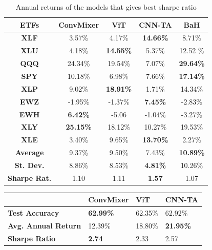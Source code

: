 \documentclass[]{article}
\begin{document}
\begin{table}[H]
\centering
 \begin{tabular}{c c c c c} 
 \hline
\textbf{ETFs} & \textbf{ConvMixer} & \textbf{ViT} & \textbf{CNN-TA} & \textbf{BaH} \\ [0.5ex] 
 \hline\hline
\textbf{XLF} & 3.57\% & 4.17\% & \textbf{14.66\%} & 8.71\% \\
 \hline
\textbf{XLU} & 4.18\% & \textbf{14.55\%} & 5.37\% & 12.52 \% \\
 \hline
\textbf{QQQ} & 24.34\% & 19.54\% & 7.07\% & \textbf{29.64\%} \\
 \hline
\textbf{SPY} & 10.18\% & 6.98\% & 7.66\% & \textbf{17.14\%} \\
 \hline
\textbf{XLP} & 9.02\% & \textbf{18.91\%} & 1.71\% & 14.34\% \\
 \hline
\textbf{EWZ} & -1.95\% & -1.37\% & \textbf{7.45\%} & -2.83\% \\
 \hline
\textbf{EWH} & \textbf{6.42\%} & -5.06 & -1.04\% & -3.27\% \\
 \hline
\textbf{XLY} & \textbf{25.15\%} & 18.12\% & 10.27\% & 19.53\% \\
 \hline
\textbf{XLE} & 3.40\% & 9.65\% & \textbf{13.70\%} & 2.27\% \\
 \hline
\textbf{Average} & 9.37\% & 9.50\% & 7.43\% & \textbf{10.89\%} \\
 \hline
\textbf{St. Dev.} & 8.86\% & 8.53\% & \textbf{4.81\%} & 10.26\% \\
 \hline
\textbf{Sharpe Rat.} & 1.10 & 1.11 & \textbf{1.57} & 1.07 \\
 \hline
 \end{tabular}
 \caption{Annual returns of the models that gives best sharpe ratio}
\end{table}

\begin{table}[H]
    \centering
    \begin{tabular}{|l|l|l|l|}
    \hline
        ~ & \textbf{ConvMixer} & \textbf{ViT} & \textbf{CNN-TA} \\ \hline
        \textbf{Test Accuracy} & \textbf{62.99\%} & 62.35\% & 62.92\% \\ \hline
        \textbf{Avg. Annual Return} & 12.39\% & 18.80\% & \textbf{21.95\%} \\ \hline
        \textbf{Sharpe Ratio} & \textbf{2.74} & 2.33 & 2.57 \\ \hline
    \end{tabular}
\end{table}
\end{document}
